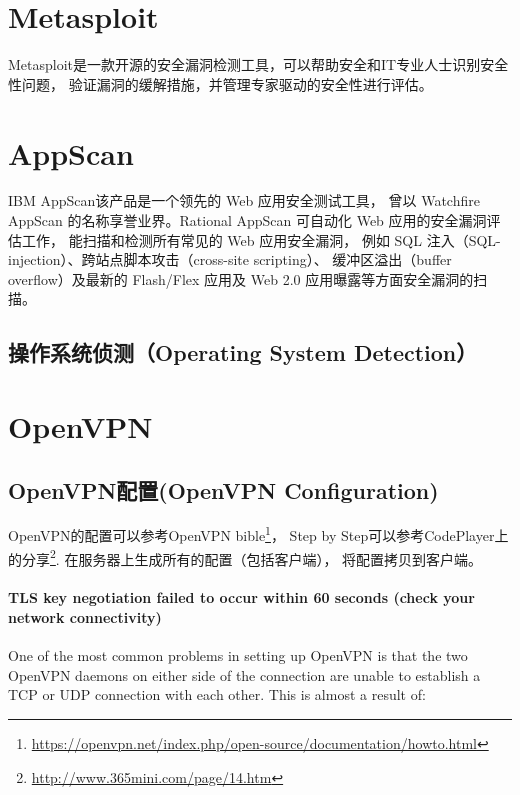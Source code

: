 \documentclass{book}
\begin{document}
\section{Metasploit}

Metasploit是一款开源的安全漏洞检测工具，可以帮助安全和IT专业人士识别安全性问题，
验证漏洞的缓解措施，并管理专家驱动的安全性进行评估。




\section{AppScan}

IBM AppScan该产品是一个领先的 Web 应用安全测试工具，
曾以 Watchfire AppScan 的名称享誉业界。Rational AppScan 可自动化 Web 应用的安全漏洞评估工作，
能扫描和检测所有常见的 Web 应用安全漏洞，
例如 SQL 注入（SQL-injection）、跨站点脚本攻击（cross-site scripting）、
缓冲区溢出（buffer overflow）及最新的 Flash/Flex 应用及 Web 2.0 应用曝露等方面安全漏洞的扫描。


\subsection{操作系统侦测（Operating System Detection）}

\section{OpenVPN}





\subsection{OpenVPN配置(OpenVPN Configuration)}

OpenVPN的配置可以参考OpenVPN bible\footnote{\url{https://openvpn.net/index.php/open-source/documentation/howto.html}}，
Step by Step可以参考CodePlayer上的分享\footnote{\url{http://www.365mini.com/page/14.htm}}.
在服务器上生成所有的配置（包括客户端），
将配置拷贝到客户端。


\paragraph{TLS key negotiation failed to occur within 60 seconds (check your network connectivity)}

One of the most common problems in setting up OpenVPN is that the two OpenVPN daemons on either side of the connection are unable to establish a TCP or UDP connection with each other.
This is almost a result of:
\end{document}
